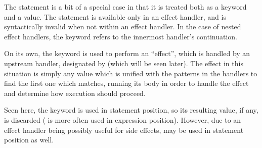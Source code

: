 The  statement is a bit of a special case in that it is
treated both as a keyword and a value. The  statement is available only
in an effect handler, and is syntactically invalid when not within an effect handler.
In the case of nested effect handlers, the  keyword refers to the innermost
handler's continuation.


\begin{bnf*}
\end{bnf*}

On its own, the  keyword is used to perform an ``effect'', which is
handled by an upstream handler, designated by  (which will be seen later).
The effect in this situation is simply any value which is unified with the patterns
in the handlers to find the first one which matches, running its body in order to
handle the effect and determine how execution should proceed.

Seen here, the  keyword is used in statement position, so its resulting
value, if any, is discarded ( is more often used in expression position).
However, due to an effect handler being possibly useful for side effects, 
may be used in statement position as well.

\begin{prooftree}
\end{prooftree}
